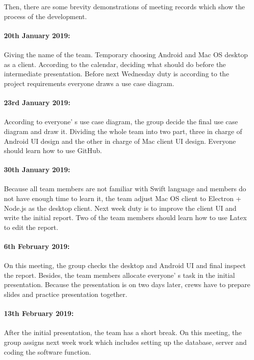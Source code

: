 \documentclass[11pt]{article}
\begin{document}
\\
\\
Then, there are some brevity demonstrations of meeting records which show the process of the development.
\\
\\
\textbf{20th January 2019:}
\\
\\
Giving the name of the team. Temporary choosing Android and Mac OS desktop as a client. According to the calendar, deciding what should do before the intermediate presentation. Before next Wednesday duty is according to the project requirements everyone draws a use case diagram.
\\
\\
\textbf{23rd January 2019:}
\\
\\
According to everyone’ s use case diagram, the group decide the final use case diagram and draw it. Dividing the whole team into two part, three in charge of Android UI design and the other in charge of Mac client UI design. Everyone should learn how to use GitHub.
\\
\\
\textbf{30th January 2019:}
\\
\\
Because all team members are not familiar with Swift language and members do not have enough time to learn it, the team adjust Mac OS client to Electron + Node.js as the desktop client. Next week duty is to improve the client UI and write the initial report. Two of the team members should learn how to use Latex to edit the report.
\\
\\
\textbf{6th February 2019:}
\\
\\
On this meeting, the group checks the desktop and Android UI and final inspect the report. Besides, the team members allocate everyone’ s task in the initial presentation. Because the presentation is on two days later, crews have to prepare slides and practice presentation together.
\\
\\
\textbf{13th February 2019:}
\\
\\
After the initial presentation, the team has a short break. On this meeting, the group assigns next week work which includes setting up the database, server and coding the software function.
\\
\\
\end{document}
